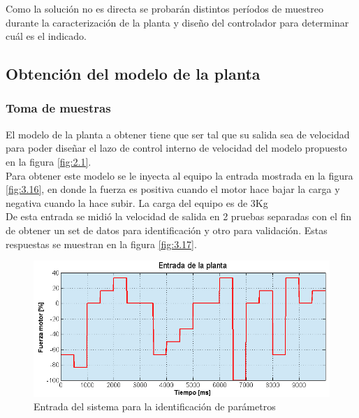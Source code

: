 Como la solución no es directa se probarán distintos períodos de muestreo durante la caracterización de la planta y diseño del controlador para determinar cuál es el indicado.

\subsection{Obtención del modelo de la planta}
\subsubsection{Toma de muestras}
El modelo de la planta a obtener tiene que ser tal que su salida sea de velocidad para poder diseñar el lazo de control interno de velocidad del modelo propuesto en la figura \ref{fig:2.1}.\\
Para obtener este modelo se le inyecta al equipo la entrada mostrada en la figura \ref{fig:3.16}, en donde la fuerza es positiva cuando el motor hace bajar la carga y negativa cuando la hace subir. La carga del equipo es de 3Kg\\
De esta entrada se midió la velocidad de salida en 2 pruebas separadas con el fin de obtener un set de datos para identificación y otro para validación. Estas respuestas se muestran en la figura \ref{fig:3.17}.

\begin{figure}[!ht]
	\centering
	\includegraphics[width=16cm,scale=1]{resources/3_16-entradaIdentPlanta.png}
	\caption{Entrada del sistema para la identificación de parámetros}
	\label{fig:\thefigure}
\end{figure}

